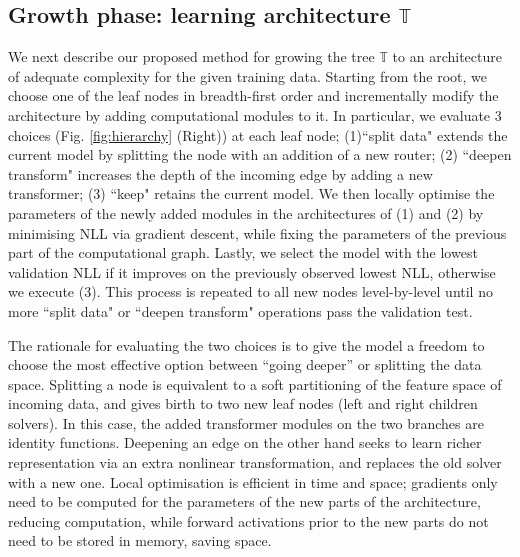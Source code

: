 \subsection{Growth phase: learning architecture \texorpdfstring{$\mathbb{T}$}{T}}
We next describe our proposed method for growing the tree $\mathbb{T}$ to an architecture of adequate complexity for the given training data. Starting from the root, we choose one of the leaf nodes in breadth-first order and incrementally modify the architecture by adding computational modules to it. In particular, we evaluate $3$ choices (Fig. \ref{fig:hierarchy} (Right)) at each leaf node; (1)``split data" extends the current model by splitting the node with an addition of a new router; (2) ``deepen transform" increases the depth of the incoming edge by adding a new transformer; (3) ``keep" retains the current model. We then locally optimise the parameters of the newly added modules in the architectures of (1) and (2) by minimising NLL via gradient descent, while fixing the parameters of the previous part of the computational graph. Lastly, we select the model with the lowest validation NLL if it improves on the previously observed lowest NLL, otherwise we execute (3). This process is repeated to all new nodes level-by-level until no more ``split data" or ``deepen transform" operations pass the validation test. 

The rationale for evaluating the two choices is to give the model a freedom to choose the most effective option between ``going deeper'' or splitting the data space. Splitting a node is equivalent to a soft partitioning of the feature space of incoming data, and gives birth to two new leaf nodes (left and right children solvers). In this case, the added transformer modules on the two branches are identity functions. Deepening an edge on the other hand seeks to learn richer representation via an extra nonlinear transformation, and replaces the old solver with a new one. Local optimisation is efficient in time and space; gradients only need to be computed for the parameters of the new parts of the architecture, reducing computation, while forward activations prior to the new parts do not need to be stored in memory, saving space. 

